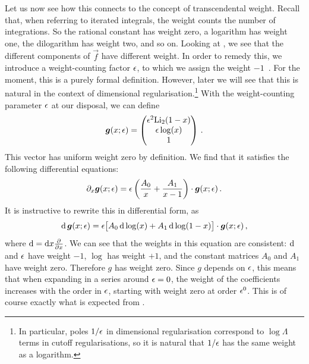 Let us now see how this connects to the concept of transcendental weight.
Recall that, when referring to iterated integrals, the weight counts the number of integrations. So the rational constant has weight zero, a logarithm has weight one, the dilogarithm has weight two, and so on.
Looking at , we see that the different components of $\vec{f}$ have different weight. 
In order to remedy this, we introduce a weight-counting factor $\epsilon$, to which we assign the weight $-1$~\cite{ch4Henn:2013pwa}.
For the moment, this is a purely formal definition. However, later we will see that this is natural in the context of dimensional regularisation.\footnote{In particular, poles $1/\epsilon$ in dimensional regularisation correspond to $\log \Lambda$ terms in cutoff regularisations, so it is natural that $1/\epsilon$ has the same weight as a logarithm.} 
With the weight-counting parameter $\epsilon$ at our disposal, we can define
\begin{align} \label{eq:defg}
\vec{g}(x;\eps)= \begin{pmatrix} \eps^2 {\rm Li}_{2}(1-x) \\ \eps \log(x) \\ 1 \end{pmatrix}
\,.
 \end{align}
This vector has uniform weight zero by definition. 
We find that it satisfies the following differential equations:
 \begin{align}\label{eqDEgLi2canonical0}
 \partial_x \vec{g}(x;\eps) = \eps \left( \frac{A_0}{x} + \frac{A_1}{x-1} \right) \cdot \vec{g}(x;\eps) \,.
 \end{align}
It is instructive to rewrite this in differential form, as
\begin{align}\label{eqDEgLi2canonical}
\d \, \vec{g}(x;\eps) = \eps \bigl[ A_0\, \d \log(x) + A_1\, \d \log(1-x) \bigr] \cdot \vec{g}(x;\eps) \,,
\end{align}
 where $\mathrm{d}= \mathrm{d} x \frac{\partial}{\partial x}$.
 We can see that the weights in this equation are consistent:
 $\mathrm{d}$ and $\epsilon$ have weight $-1$, $\log$ has weight $+1$, and the constant matrices $A_0$ and $A_1$ have weight zero. 
  Therefore $g$ has weight zero. 
  Since $g$ depends on $\epsilon$, this means that when expanding in a series around $\epsilon=0$, the weight of the coefficients increases with the order in $\epsilon$, starting with weight zero at order $\epsilon^0$.
  This is of course exactly what is expected from .
  
